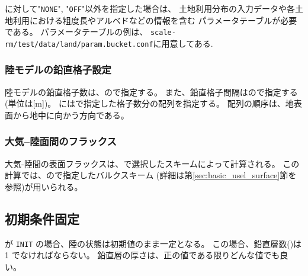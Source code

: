 に対して"\verb|NONE|", "\verb|OFF|"以外を指定した場合は、
土地利用分布の入力データや各土地利用における粗度長やアルベドなどの情報を含む
パラメータテーブルが必要である。
パラメータテーブルの例は、
\verb|scale-rm/test/data/land/param.bucket.conf|に用意してある.


\subsubsection{陸モデルの鉛直格子設定}

陸モデルの鉛直格子数は、ので指定する。
また、鉛直格子間隔はので指定する(単位は[m])。
にはで指定した格子数分の配列を指定する。
配列の順序は、地表面から地中に向かう方向である。


\subsubsection{大気--陸面間のフラックス}
大気-陸間の表面フラックスは、で選択したスキームによって計算される。
この計算では、ので指定したバルクスキーム
(詳細は第\ref{sec:basic_usel_surface}節を参照)が用いられる。


\subsection{初期条件固定}
 が \verb|INIT| の場合、陸の状態は初期値のまま一定となる。
この場合、鉛直層数()は 1 でなければならない。
鉛直層の厚さは、正の値である限りどんな値でも良い。


